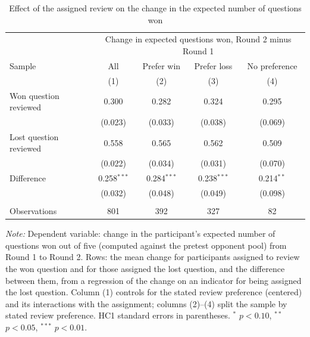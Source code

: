 \begin{table}[tbp]\centering
  \begin{threeparttable}\small
    \caption{Effect of the assigned review on the change in the expected number of questions won}
    \label{tab:nba_experiment}
    \begin{tabular}{lcccc}
      \toprule
       & \multicolumn{4}{c}{Change in expected questions won, Round 2 minus Round 1}\\
      Sample & All & Prefer win & Prefer loss & No preference\\
       & (1) & (2) & (3) & (4)\\
      \midrule
      Won question reviewed & 0.300 & 0.282 & 0.324 & 0.295\\
       & (0.023) & (0.033) & (0.038) & (0.069)\\
      Lost question reviewed & 0.558 & 0.565 & 0.562 & 0.509\\
       & (0.022) & (0.034) & (0.031) & (0.070)\\
      Difference & 0.258$^{***}$ & 0.284$^{***}$ & 0.238$^{***}$ & 0.214$^{**}$\\
       & (0.032) & (0.048) & (0.049) & (0.098)\\
       \\
      Observations & 801 & 392 & 327 & 82\\
      \bottomrule
    \end{tabular}
    \begin{tablenotes}
      \footnotesize
      \item \textit{Note:} Dependent variable: change in the participant's expected number of questions won out of five (computed against the pretest opponent pool) from Round 1 to Round 2. Rows: the mean change for participants assigned to review the won question and for those assigned the lost question, and the difference between them, from a regression of the change on an indicator for being assigned the lost question. Column (1) controls for the stated review preference (centered) and its interactions with the assignment; columns (2)--(4) split the sample by stated review preference. HC1 standard errors in parentheses. $^{*}$ $p<0.10$, $^{**}$ $p<0.05$, $^{***}$ $p<0.01$.
    \end{tablenotes}
  \end{threeparttable}
\end{table}
